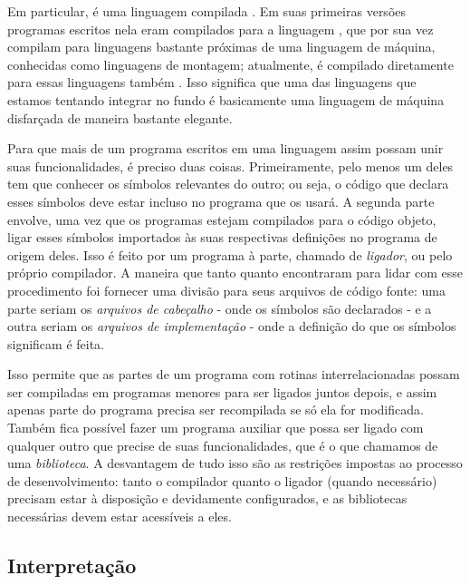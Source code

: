     Em particular, \CXX{} é uma linguagem compilada \cite{cpp:00}. Em suas
    primeiras versões programas escritos nela eram compilados para a linguagem
    \C{}, que por sua vez compilam para linguagens bastante próximas de uma
    linguagem de máquina, conhecidas como linguagens de montagem; atualmente,
    \CXX{} é compilado diretamente para essas linguagens também \cite{cpp:01}.
    Isso significa que uma das linguagens que estamos tentando integrar no fundo
    é basicamente uma linguagem de máquina disfarçada de maneira bastante
    elegante.
    
    Para que mais de um programa escritos em uma linguagem assim
    possam unir suas funcionalidades, é preciso duas coisas. Primeiramente, pelo
    menos um deles tem que conhecer os símbolos\footnotemark{} relevantes do
    outro; ou seja, o código que declara esses símbolos deve estar incluso no
    programa que os usará. A segunda parte envolve, uma vez que os programas
    estejam compilados para o código objeto, ligar esses símbolos importados às
    suas respectivas definições no programa de origem deles. Isso é feito por um
    programa à parte, chamado de \emph{ligador}, ou pelo próprio compilador. A
    maneira que tanto \C{} quanto \CXX{} encontraram para lidar com esse
    procedimento foi fornecer uma divisão para seus arquivos de código fonte:
    uma parte seriam os \emph{arquivos de cabeçalho} - onde os símbolos são
    declarados - e a outra seriam os \emph{arquivos de implementação} - onde a
    definição do que os símbolos significam é feita.


    Isso permite que as partes de um programa com rotinas interrelacionadas
    possam ser compiladas em programas menores para ser ligados juntos depois,
    e assim apenas parte do programa precisa ser recompilada se só ela for
    modificada. Também fica possível fazer um programa auxiliar que possa ser
    ligado com qualquer outro que precise de suas funcionalidades, que é o que
    chamamos de uma \emph{biblioteca}. A desvantagem de tudo isso são as
    restrições impostas ao processo de desenvolvimento: tanto o compilador
    quanto o ligador (quando necessário) precisam estar à disposição e
    devidamente configurados, e as bibliotecas necessárias devem estar
    acessíveis a eles.

    \subsection{Interpretação}
    \label{cap:conceitos:maquina:interpretacao}

